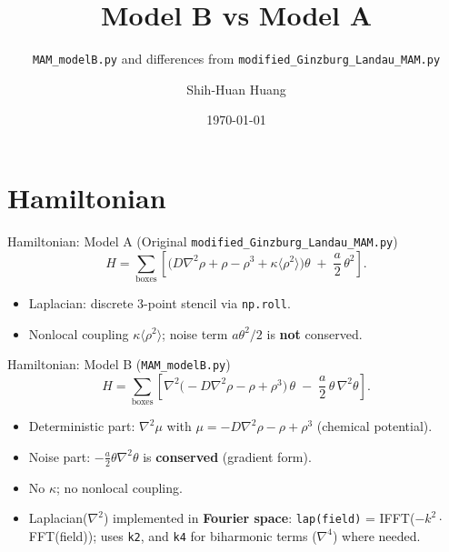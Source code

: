 \documentclass{beamer}
\title{Model B vs Model A}
\subtitle{\texttt{MAM\_modelB.py} and differences from \texttt{modified\_Ginzburg\_Landau\_MAM.py}}
\author{Shih-Huan Huang}
\date{\today}
\begin{document}
\begin{frame}
    \titlepage
\end{frame}

\section{Hamiltonian}
\begin{frame}{Hamiltonian: Model A}
    (Original \texttt{modified\_Ginzburg\_Landau\_MAM.py})
    \begin{equation}
        H = \sum_{\mathrm{boxes}} \left[ \big( D\nabla^2\rho + \rho - \rho^3 + \kappa\langle\rho^2\rangle \big) \theta \;+\; \frac{a}{2}\,\theta^2 \right].
    \end{equation}
    \begin{itemize}
        \item Laplacian: discrete 3-point stencil via \texttt{np.roll}.
        \item Nonlocal coupling $\kappa\langle\rho^2\rangle$; noise term $a\theta^2/2$ is \textbf{not} conserved.
    \end{itemize}
\end{frame}

\begin{frame}{Hamiltonian: Model B}
    (\texttt{MAM\_modelB.py})
    \begin{equation}
        H = \sum_{\mathrm{boxes}} \left[ \nabla^2\big( -D\nabla^2\rho - \rho + \rho^3 \big)\,\theta \;-\; \frac{a}{2}\,\theta\,\nabla^2\theta \right].
    \end{equation}
    \begin{itemize}
        \item Deterministic part: $\nabla^2\mu$ with $\mu = -D\nabla^2\rho - \rho + \rho^3$ (chemical potential).
        \item Noise part: $-\frac{a}{2}\theta\nabla^2\theta$ is \textbf{conserved} (gradient form).
        \item No $\kappa$; no nonlocal coupling.
        \item Laplacian($\nabla^2$) implemented in \textbf{Fourier space}: \texttt{lap(field)} = IFFT($-k^2\cdot$FFT(field)); uses \texttt{k2}, and \texttt{k4} for biharmonic terms ($\nabla^4$) where needed.
    \end{itemize}
\end{frame}
\end{document}
